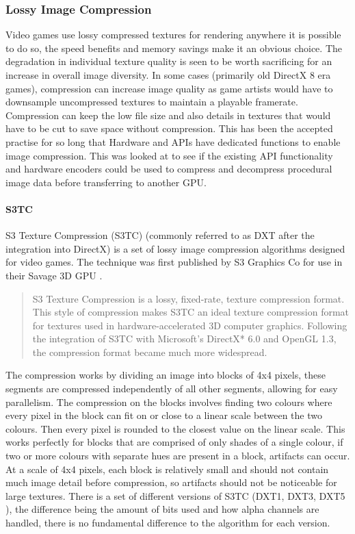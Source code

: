 \documentclass[12pt,a4paper]{article}
\begin{document}
\subsubsection{Lossy Image Compression}
Video games use lossy compressed textures for rendering anywhere it is possible to do so, the speed benefits and memory savings make it an obvious choice. The degradation in individual texture quality is seen to be worth sacrificing for an increase in overall image diversity. In some cases (primarily old DirectX 8 era games), compression can increase image quality as game artists would have to downsample uncompressed textures to maintain a playable framerate. Compression can keep the low file size and also details in textures that would have to be cut to save space without compression. This has been the accepted practise for so long that Hardware and APIs have dedicated functions to enable image compression. This was looked at to see if the existing API functionality and hardware encoders could be used to compress and decompress procedural image data before transferring to another GPU.

\paragraph{S3TC}
S3 Texture Compression (S3TC) (commonly referred to as DXT after the integration into DirectX) is a set of lossy image compression algorithms designed for video games. The technique was first published by S3 Graphics Co for use in their Savage 3D GPU \cite{hong2004fixed} .

\blockquote[\cite{anddxt}]{S3 Texture Compression is a lossy, fixed-rate, texture compression format. This style of compression makes S3TC an ideal texture compression format for textures used in hardware-accelerated 3D computer graphics. Following the integration of S3TC with Microsoft’s DirectX* 6.0 and OpenGL 1.3, the compression format became much more widespread.}

The compression works by dividing an image into blocks of 4x4 pixels, these segments are compressed independently of all other segments, allowing for easy parallelism. The compression on the blocks involves finding two colours where every pixel in the block can fit on or close to a linear scale between the two colours. Then every pixel is rounded to the closest value on the linear scale.
This works perfectly for blocks that are comprised of only shades of a single colour, if two or more colours with separate hues are present in a block, artifacts can occur. At a scale of 4x4 pixels, each block is relatively small and should not contain much image detail before compression, so artifacts should not be noticeable for large textures. There is a set of different versions of S3TC (DXT1, DXT3, DXT5 ), the difference being the amount of bits used and how alpha channels are handled, there is no fundamental difference to the algorithm for each version.
\end{document}
